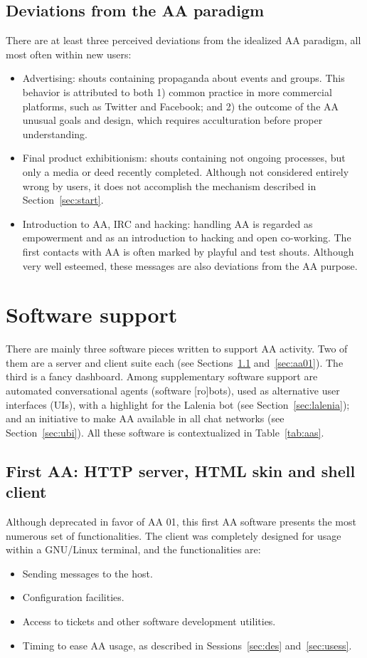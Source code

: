 \documentclass[12pt,fleqn]{article}
\begin{document}
\subsection{Deviations from the AA paradigm}\label{sec:devia}
There are at least three perceived deviations from the idealized AA paradigm,
all most often within new users:
\begin{itemize}
    \item Advertising: shouts containing propaganda about events and groups.
	    This behavior is attributed to both 1) common practice in more commercial platforms,
		such as Twitter and Facebook;
		and 2) the outcome of the AA unusual goals and design,
		which requires acculturation before proper understanding.
    \item Final product exhibitionism: shouts containing not ongoing processes,
	    but only a media or deed recently completed.
		Although not considered entirely wrong by users,
		it does not accomplish the mechanism described in Section~\ref{sec:start}.
    \item Introduction to AA, IRC and hacking:
	    handling AA is regarded as empowerment and as an introduction to hacking and open co-working.
		The first contacts with AA is often marked by playful and test shouts.
		Although very well esteemed, these messages are also deviations from the AA purpose.
\end{itemize}

\section{Software support}\label{sec:sofsup}
There are mainly three software pieces written to support AA activity.
Two of them are a server and client suite each (see Sections~\ref{sec:aaFirst} and~\ref{sec:aa01}).
The third is a fancy dashboard.
Among supplementary software support are automated conversational agents (software [ro]bots),
used as alternative user interfaces (UIs),
with a highlight for the Lalenia bot (see Section~\ref{sec:lalenia});
and an initiative to make AA available in all chat networks (see Section~\ref{sec:ubi}).
All these software is contextualized in Table~\ref{tab:aas}.

\subsection{First AA: HTTP server, HTML skin and shell client}\label{sec:aaFirst}
Although deprecated in favor of AA 01,
this first AA software presents the most numerous set of functionalities.
The client was completely designed for usage within a GNU/Linux terminal,
and the functionalities are:
\begin{itemize}
    \item Sending messages to the host.
    \item Configuration facilities.
    \item Access to tickets and other software development utilities.
    \item Timing to ease AA usage, as described in Sessions~\ref{sec:des} and~\ref{sec:usess}.
\end{itemize}
\end{document}
